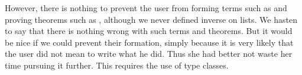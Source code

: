 \begin{isabellebody}
\begin{isamarkuptext}
However, there is nothing to prevent the user from forming terms such as
 and proving theorems such as , although we never defined inverse on lists. We hasten to say
that there is nothing wrong with such terms and theorems. But it would be
nice if we could prevent their formation, simply because it is very likely
that the user did not mean to write what he did. Thus she had better not waste
her time pursuing it further. This requires the use of type classes.%
\end{isamarkuptext}%
\end{isabellebody}%
